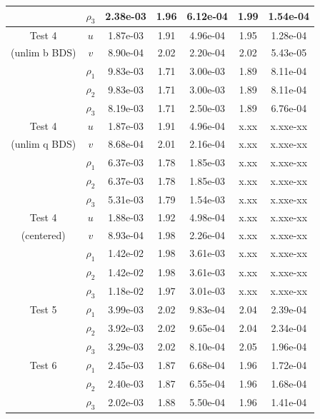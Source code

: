 \documentclass[final]{siamltex}
\begin{document}
\begin{table}[h]
\begin{center}
\begin{tabular}{ccccccc}
                    & $\rho_3$ & 2.38e-03 & 1.96 & 6.12e-04 & 1.99 & 1.54e-04 \\
\hline
Test 4              & $u$      & 1.87e-03 & 1.91 & 4.96e-04 & 1.95 & 1.28e-04 \\
(unlim b BDS)       & $v$      & 8.90e-04 & 2.02 & 2.20e-04 & 2.02 & 5.43e-05 \\
                    & $\rho_1$ & 9.83e-03 & 1.71 & 3.00e-03 & 1.89 & 8.11e-04 \\
                    & $\rho_2$ & 9.83e-03 & 1.71 & 3.00e-03 & 1.89 & 8.11e-04 \\
                    & $\rho_3$ & 8.19e-03 & 1.71 & 2.50e-03 & 1.89 & 6.76e-04 \\
\hline
Test 4              & $u$      & 1.87e-03 & 1.91 & 4.96e-04 & x.xx & x.xxe-xx \\
(unlim q BDS)       & $v$      & 8.68e-04 & 2.01 & 2.16e-04 & x.xx & x.xxe-xx \\
                    & $\rho_1$ & 6.37e-03 & 1.78 & 1.85e-03 & x.xx & x.xxe-xx \\
                    & $\rho_2$ & 6.37e-03 & 1.78 & 1.85e-03 & x.xx & x.xxe-xx \\
                    & $\rho_3$ & 5.31e-03 & 1.79 & 1.54e-03 & x.xx & x.xxe-xx \\
\hline
Test 4              & $u$      & 1.88e-03 & 1.92 & 4.98e-04 & x.xx & x.xxe-xx \\
(centered)          & $v$      & 8.93e-04 & 1.98 & 2.26e-04 & x.xx & x.xxe-xx \\
                    & $\rho_1$ & 1.42e-02 & 1.98 & 3.61e-03 & x.xx & x.xxe-xx \\
                    & $\rho_2$ & 1.42e-02 & 1.98 & 3.61e-03 & x.xx & x.xxe-xx \\
                    & $\rho_3$ & 1.18e-02 & 1.97 & 3.01e-03 & x.xx & x.xxe-xx \\
\hline
Test 5              & $\rho_1$ & 3.99e-03 & 2.02 & 9.83e-04 & 2.04 & 2.39e-04 \\
                    & $\rho_2$ & 3.92e-03 & 2.02 & 9.65e-04 & 2.04 & 2.34e-04 \\
                    & $\rho_3$ & 3.29e-03 & 2.02 & 8.10e-04 & 2.05 & 1.96e-04 \\
\hline
Test 6              & $\rho_1$ & 2.45e-03 & 1.87 & 6.68e-04 & 1.96 & 1.72e-04 \\
                    & $\rho_2$ & 2.40e-03 & 1.87 & 6.55e-04 & 1.96 & 1.68e-04 \\
                    & $\rho_3$ & 2.02e-03 & 1.88 & 5.50e-04 & 1.96 & 1.41e-04 \\

\end{tabular}
\end{center}
\end{table}
\end{document}
